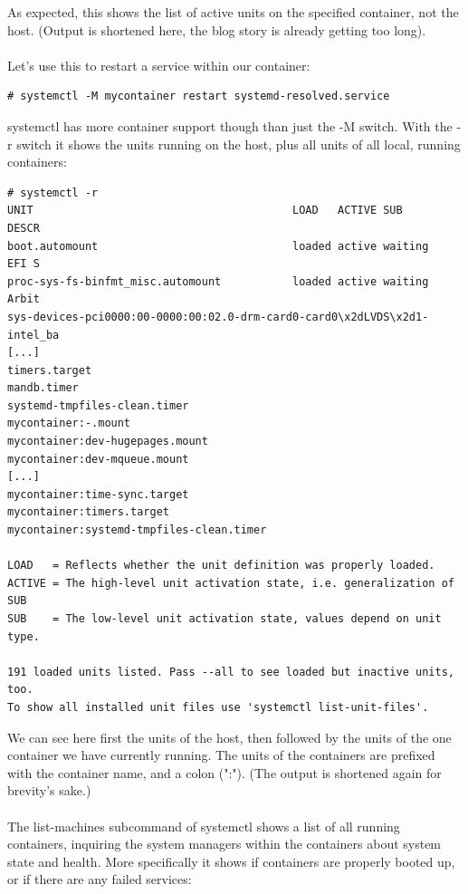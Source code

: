 \documentclass[titlepage]{article}
\begin{document}
As expected, this shows the list of active units on the specified container, not the host. (Output is shortened here, the blog story is already getting too long).
\\
\\
Let's use this to restart a service within our container:
\begin{lstlisting}
# systemctl -M mycontainer restart systemd-resolved.service
\end{lstlisting}
systemctl has more container support though than just the -M switch. With the -r switch it shows the units running on the host, plus all units of all local, running containers:
\begin{lstlisting}
# systemctl -r
UNIT                                        LOAD   ACTIVE SUB       DESCR
boot.automount                              loaded active waiting   EFI S
proc-sys-fs-binfmt_misc.automount           loaded active waiting   Arbit
sys-devices-pci0000:00-0000:00:02.0-drm-card0-card0\x2dLVDS\x2d1-intel_ba
[...]
timers.target                                                            
mandb.timer                                                              
systemd-tmpfiles-clean.timer                                             
mycontainer:-.mount                                                      
mycontainer:dev-hugepages.mount                                          
mycontainer:dev-mqueue.mount                                             
[...]
mycontainer:time-sync.target                                             
mycontainer:timers.target                                                
mycontainer:systemd-tmpfiles-clean.timer                                 

LOAD   = Reflects whether the unit definition was properly loaded.
ACTIVE = The high-level unit activation state, i.e. generalization of SUB
SUB    = The low-level unit activation state, values depend on unit type.

191 loaded units listed. Pass --all to see loaded but inactive units, too.
To show all installed unit files use 'systemctl list-unit-files'.
\end{lstlisting}
We can see here first the units of the host, then followed by the units of the one container we have currently running. The units of the containers are prefixed with the container name, and a colon (":"). (The output is shortened again for brevity's sake.)
\\
\\
The list-machines subcommand of systemctl shows a list of all running containers, inquiring the system managers within the containers about system state and health. More specifically it shows if containers are properly booted up, or if there are any failed services:
\end{document}
